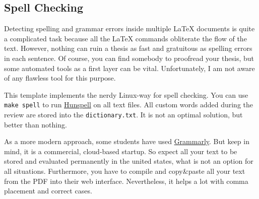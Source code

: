 \documentclass[\myrootdir/main.tex]{subfiles}
\begin{document}
\subsection{Spell Checking}
Detecting spelling and grammar errors inside multiple LaTeX documents is quite a complicated task because all the LaTeX commands obliterate the flow of the text.
However, nothing can ruin a thesis as fast and gratuitous as spelling errors in each sentence.
Of course, you can find somebody to proofread your thesis, but some automated tools as a first layer can be vital.
Unfortunately, I am not aware of any flawless tool for this purpose.

This template implements the nerdy Linux-way for spell checking.
You can use \texttt{make spell} to run \href{https://hunspell.github.io/}{Hunspell} on all text files.
All custom words added during the review are stored into the \texttt{dictionary.txt}.
It is not an optimal solution, but better than nothing.

As a more modern approach, some students have used \href{https://grammarly.com/}{Grammarly}.
But keep in mind, it is a commercial, cloud-based startup.
So expect all your text to be stored and evaluated permanently in the united states, what is not an option for all situations.
Furthermore, you have to compile and copy\&paste all your text from the PDF into their web interface.
Nevertheless, it helps a lot with comma placement and correct cases.
\end{document}

